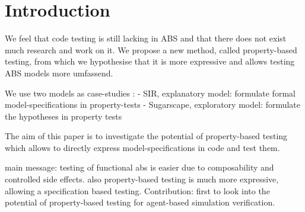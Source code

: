 \section{Introduction}
We feel that code testing is still lacking in ABS and that there does not exist much research and work on it. We propose a new method, called property-based testing, from which we hypothesise that it is more expressive and allows testing ABS models more umfassend.

We use two models as case-studies :
- SIR, explanatory model: formulate formal model-specifications in property-tests
- Sugarscape, exploratory model: formulate the hypotheses in property tests

The aim of this paper is to investigate the potential of property-based testing which allows to directly express model-specifications in code and test them. 

main message: testing of functional abs is easier due to composability and controlled side effects. also property-based testing is much more expressive, allowing a specification based testing. 
Contribution: first to look into the potential of property-based testing for agent-based simulation verification. 